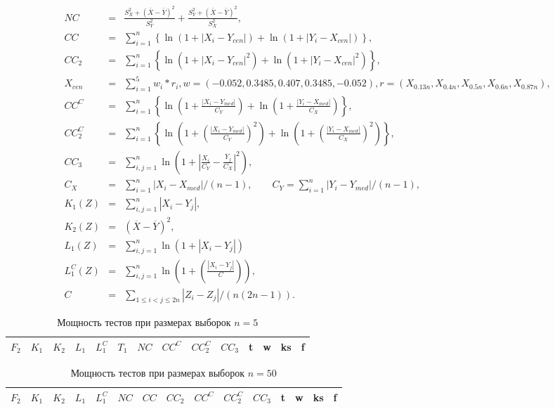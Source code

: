 \documentclass{article}
\begin{document}
\begin{eqnarray}
  NC &=& \frac{S_X^2+(\bar X-\bar Y)^2}{S_Y^2} + \frac{S_Y^2+(\bar X-\bar Y)^2}{S_X^2},\\
  CC &=& \sum_{i=1}^n\left\{\ln\left(1+|X_i-Y_{cen}|\right) + \ln\left(1+|Y_i-X_{cen}|\right)\right\},\\
  CC_2 &=& \sum_{i=1}^n\left\{\ln\left(1+|X_i-Y_{cen}|^2\right) + \ln\left(1+|Y_i-X_{cen}|^2\right)\right\},\\
  X_{cen} &=& \sum_{i=1}^5w_i*r_i, w = (-0.052,0.3485,0.407,0.3485,-0.052), r = (X_{0.13n},X_{0.4n},X_{0.5n},X_{0.6n},X_{0.87n}),\\
  CC^C &=& \sum_{i=1}^n\left\{\ln\left(1+\frac{|X_i-Y_{med}|}{C_Y}\right) + \ln\left(1+\frac{|Y_i-X_{med}|}{C_X}\right)\right\},\\
  CC_2^C &=& \sum_{i=1}^n\left\{\ln\left(1+\left(\frac{|X_i-Y_{med}|}{C_Y}\right)^2\right) + \ln\left(1+\left(\frac{|Y_i-X_{med}|}{C_X}\right)^2\right)\right\},\\
  CC_3 &=& \sum_{i,j=1}^n \ln \left( 1+\left| \frac{X_i}{C_Y} - \frac{Y_j}{C_X} \right|^2 \right),\\
  C_X &=& \sum_{i=1}^n|X_i-X_{med}|/(n-1),\qquad C_Y = \sum_{i=1}^n|Y_i-Y_{med}|/(n-1),\\
  \label{K1}
  K_1(Z)&=&\sum_{i,j=1}^{n}{|X_{i}-Y_{j}|},\\
  \label{K6}
  K_2(Z)&=&(\overline{X} - \overline{Y})^2,\\
  \label{L1}
  L_1(Z)&=&\sum_{i,j=1}^{n}{\ln(1+|X_{i}-Y_{j}|)}\\
  \label{L1C}
  L_1^C(Z)&=&\sum_{i,j=1}^{n}{\ln\left(1+\left(\frac{|X_{i}-Y_{j}|}{C}\right)\right)},\\
  \label{C}
  C&=&\sum_{1\le i<j\le 2n}{|Z_{i}-Z_{j}|}/(n(2n-1)).
\end{eqnarray}

\begin{longtable}{|c|c|c|c|c|c|c|c|c|c|c|c|c|c|}
  \caption{Мощность тестов при размерах выборок $n=5$}
  \label{table:n5} \\
  \hline
  $F_2$ & $K_{1}$ & $K_{2}$ & $L_{1}$ & $L_{1}^C$ & $T_1$ & $NC$ & $CC^C$ & $CC_2^C$ & $CC_3$ & t & w & ks & f \\ \hline
  
  
  
  
\end{longtable}

\begin{longtable}{|c|c|c|c|c|c|c|c|c|c|c|c|c|c|c|}
  \caption{Мощность тестов при размерах выборок $n=50$}
  \label{table:n5} \\
  \hline
  $F_2$ & $K_{1}$ & $K_{2}$ & $L_{1}$ & $L_{1}^C$ & $NC$ & $CC$ & $CC_2$ & $CC^C$ & $CC_2^C$ & $CC_3$ & t & w & ks & f \\ \hline
  
\end{longtable}
\end{document}
